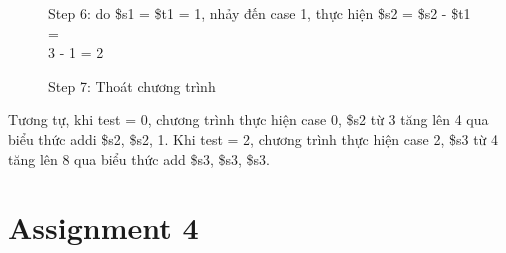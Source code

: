 \documentclass[a4paper,12pt]{article}
\begin{document}
\begin{figure}[!h]
	\centerline{}
	\caption*{Step 6: do \$s1 = \$t1 = 1, nhảy đến case 1, thực hiện \$s2 = \$s2 - \$t1 = \\ 3 - 1 = 2}
	\label{fig:3s6}
\end{figure}
\clearpage
\newpage
\begin{figure}[!h]
	\centerline{}
	\caption*{Step 7: Thoát chương trình}
	\label{fig:3s7}
\end{figure}
\noindent 
Tương tự, khi test = 0, chương trình thực hiện case 0, \$s2 từ 3 tăng lên 4 qua biểu thức addi \$s2, \$s2, 1.
Khi test = 2, chương trình thực hiện case 2, \$s3 từ 4 tăng lên 8 qua biểu thức add \$s3, \$s3, \$s3.
\clearpage
\newpage
\section{Assignment 4}
\end{document}
